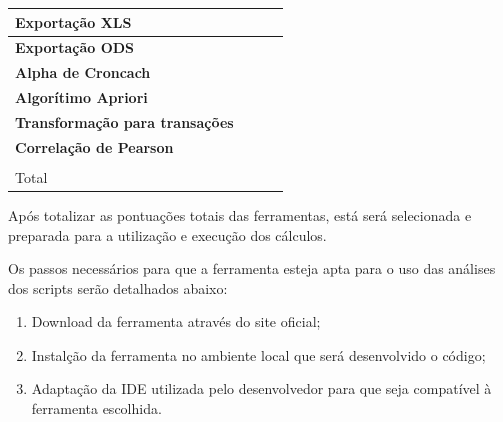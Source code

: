 \begin{table}[]
\begin{tabular}{@{}llll@{}}
        \multicolumn{1}{|l|}{\textbf{Exportação XLS}}                & \multicolumn{1}{l|}{}                      & \multicolumn{1}{l|}{}                      & \multicolumn{1}{l|}{}                      \\ \midrule
        \multicolumn{1}{|l|}{\textbf{Exportação ODS}}                & \multicolumn{1}{l|}{}                      & \multicolumn{1}{l|}{}                      & \multicolumn{1}{l|}{}                      \\ \midrule
        \multicolumn{1}{|l|}{\textbf{Alpha de Croncach}}             & \multicolumn{1}{l|}{}                      & \multicolumn{1}{l|}{}                      & \multicolumn{1}{l|}{}                      \\ \midrule
        \multicolumn{1}{|l|}{\textbf{Algorítimo Apriori}}            & \multicolumn{1}{l|}{}                      & \multicolumn{1}{l|}{}                      & \multicolumn{1}{l|}{}                      \\ \midrule
        \multicolumn{1}{|l|}{\textbf{Transformação para transações}} & \multicolumn{1}{l|}{}                      & \multicolumn{1}{l|}{}                      & \multicolumn{1}{l|}{}                      \\ \midrule
        \multicolumn{1}{|l|}{\textbf{Correlação de Pearson}}         & \multicolumn{1}{l|}{}                      & \multicolumn{1}{l|}{}                      & \multicolumn{1}{l|}{}                      \\ \midrule
                                                             &                                            &                                            &                                            \\ \midrule
        \multicolumn{1}{|l|}{Total}                                  & \multicolumn{1}{l|}{}                      & \multicolumn{1}{l|}{}                      & \multicolumn{1}{l|}{}                      \\ \bottomrule
    \end{tabular}
\end{table}

Após totalizar as pontuações totais das ferramentas, está será selecionada e preparada para a utilização e execução dos cálculos.

Os passos necessários para que a ferramenta esteja apta para o uso das análises dos scripts serão detalhados abaixo:

\begin{enumerate}
    \item Download da ferramenta através do site oficial;
    \item Instalção da ferramenta no ambiente local que será desenvolvido o código;
    \item Adaptação da IDE utilizada pelo desenvolvedor para que seja compatível à ferramenta escolhida.
\end{enumerate}

